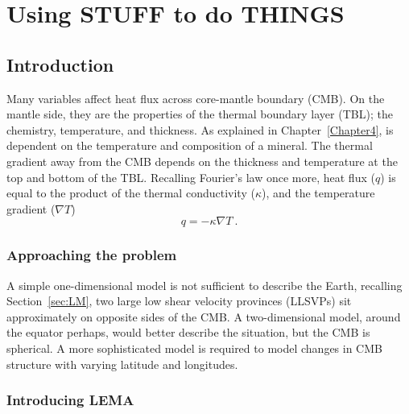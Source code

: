 
\chapter{Using STUFF to do THINGS} %

\label{Chapter5} %

\section{Introduction}

Many variables affect heat flux across core-mantle boundary (CMB). On the mantle side, they are the properties of the thermal boundary layer (TBL); the chemistry, temperature, and thickness. As explained in Chapter~\ref{Chapter4}, \tcs is dependent on the temperature and composition of a mineral. The thermal gradient away from the CMB depends on the thickness and temperature at the top and bottom of the TBL. Recalling Fourier's law once more, heat flux ($q$) is equal to the product of the thermal conductivity ($\kappa$), and the temperature gradient ($\nabla{T}$)
%
\begin{equation}
q=-\kappa \nabla{T}\ . 
\label{eq:fourier5}
\end{equation}

\subsection{Approaching the problem}

A simple one-dimensional model is not sufficient to describe the Earth, recalling Section~\ref{sec:LM}, two large low shear velocity provinces (LLSVPs) sit approximately on opposite sides of the CMB. A two-dimensional model, around the equator perhaps, would better describe the situation, but the CMB is spherical. A more sophisticated model is required to model changes in CMB structure with varying latitude and longitudes.

\subsection{Introducing LEMA}


